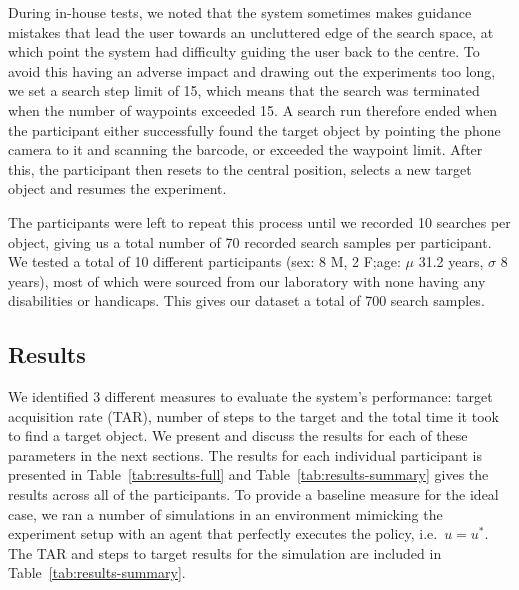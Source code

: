 \documentclass[a4paper, twoside]{article}
\begin{document}
During in-house tests, we noted that the system sometimes makes guidance mistakes that lead the user towards an uncluttered edge of the search space, at which point the system had difficulty guiding the user back to the centre. To avoid this having an adverse impact and drawing out the experiments too long, we set a search step limit of 15, which means that the search was terminated when the number of waypoints exceeded 15. A search run therefore ended when the participant either successfully found the target object by pointing the phone camera to it and scanning the barcode, or exceeded the waypoint limit. After this, the participant then resets to the central position, selects a new target object and resumes the experiment.

The participants were left to repeat this process until we recorded 10 searches per object, giving us a total number of 70 recorded search samples per participant. We tested a total of 10 different participants (sex: 8 M, 2 F;\@ age: $\mu$ 31.2 years, $\sigma$ 8 years), most of which were sourced from our laboratory with none having any disabilities or handicaps. This gives our dataset a total of 700 search samples.

\subsection{Results}

\noindent We identified 3 different measures to evaluate the system's performance: target acquisition rate (TAR), number of steps to the target and the total time it took to find a target object. We present and discuss the results for each of these parameters in the next sections. The results for each individual participant is presented in Table~\ref{tab:results-full} and Table~\ref{tab:results-summary} gives the results across all of the participants. To provide a baseline measure for the ideal case, we ran a number of simulations in an environment mimicking the experiment setup with an agent that perfectly executes the policy, i.e.\ $u=u^*$. The TAR and steps to target results for the simulation are included in Table~\ref{tab:results-summary}.
\end{document}
